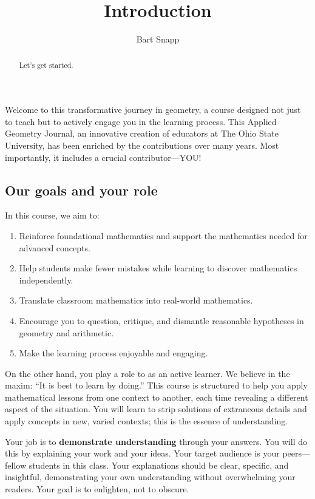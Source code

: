 \documentclass[handout,nooutcomes,noauthor]{ximera}
\title{Introduction}
\author{Bart Snapp}
\begin{document}
\begin{abstract}
  Let's get started.
\end{abstract}
\maketitle





Welcome to this transformative journey in geometry, a course designed
not just to teach but to actively engage you in the learning
process. This Applied Geometry Journal, an innovative creation of
educators at The Ohio State University, has been enriched by the
contributions over many years. Most importantly, it includes a crucial
contributor---YOU!






\subsection*{Our goals and your role}


In this course, we aim to:
\begin{enumerate}
\item Reinforce foundational mathematics and support the mathematics needed for advanced concepts.
\item Help students make fewer mistakes while learning to discover mathematics independently.
\item Translate classroom mathematics into real-world mathematics.
\item Encourage you to question, critique, and dismantle reasonable
  hypotheses in geometry and arithmetic.
\item Make the learning process enjoyable and engaging.
\end{enumerate}


On the other hand, you play a role to as an active learner. We believe
in the maxim: ``It is best to learn by doing.'' This course is
structured to help you apply mathematical lessons from one context to
another, each time revealing a different aspect of the situation. You
will learn to strip solutions of extraneous details and apply concepts
in new, varied contexts; this is the essence of understanding.

Your job is to \textbf{demonstrate understanding} through your
answers. You will do this by explaining your work and your ideas.
Your target audience is your peers—fellow students in this class. Your
explanations should be clear, specific, and insightful, demonstrating
your own understanding without overwhelming your readers. Your goal is
to enlighten, not to obscure.
\end{document}
